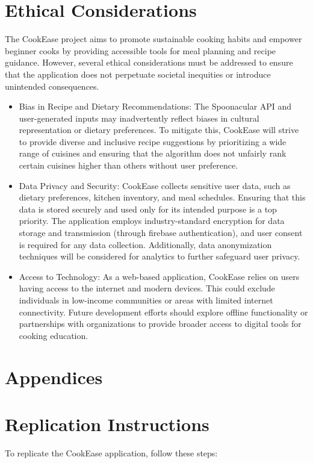 \documentclass[10pt,twocolumn]{article}
\begin{document}
\section{Ethical Considerations}
The CookEase project aims to promote sustainable cooking habits and empower beginner cooks by providing accessible tools for meal planning and recipe guidance. However, several ethical considerations must be addressed to ensure that the application does not perpetuate societal inequities or introduce unintended consequences.
\begin{itemize}
    \item Bias in Recipe and Dietary Recommendations: 
    The Spoonacular API and user-generated inputs may inadvertently reflect biases in cultural representation or dietary preferences. To mitigate this, CookEase will strive to provide diverse and inclusive recipe suggestions by prioritizing a wide range of cuisines and ensuring that the algorithm does not unfairly rank certain cuisines higher than others without user preference.
    \item Data Privacy and Security:
    CookEase collects sensitive user data, such as dietary preferences, kitchen inventory, and meal schedules. Ensuring that this data is stored securely and used only for its intended purpose is a top priority. The application employs industry-standard encryption for data storage and transmission (through firebase authentication), and user consent is required for any data collection. Additionally, data anonymization techniques will be considered for analytics to further safeguard user privacy.
    \item Access to Technology: 
    As a web-based application, CookEase relies on users having access to the internet and modern devices. This could exclude individuals in low-income communities or areas with limited internet connectivity. Future development efforts should explore offline functionality or partnerships with organizations to provide broader access to digital tools for cooking education.
\end{itemize}

\section{Appendices}
\appendix
\section{Replication Instructions}
To replicate the CookEase application, follow these steps:
\end{document}
